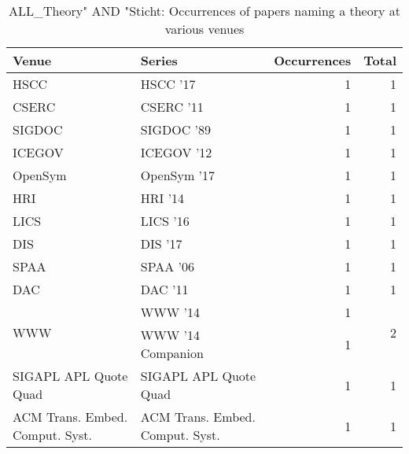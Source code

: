 \begin{table*}[t]
\begin{tabular}{llrr}
Venue & Series & Occurrences & Total\\\hline
\multirow{1}{*}{HSCC } & HSCC '17 & 1 & \multirow{1}{*}{1}\\
\multirow{1}{*}{CSERC } & CSERC '11 & 1 & \multirow{1}{*}{1}\\
\multirow{1}{*}{SIGDOC } & SIGDOC '89 & 1 & \multirow{1}{*}{1}\\
\multirow{1}{*}{ICEGOV } & ICEGOV '12 & 1 & \multirow{1}{*}{1}\\
\multirow{1}{*}{OpenSym } & OpenSym '17 & 1 & \multirow{1}{*}{1}\\
\multirow{1}{*}{HRI } & HRI '14 & 1 & \multirow{1}{*}{1}\\
\multirow{1}{*}{LICS } & LICS '16 & 1 & \multirow{1}{*}{1}\\
\multirow{1}{*}{DIS } & DIS '17 & 1 & \multirow{1}{*}{1}\\
\multirow{1}{*}{SPAA } & SPAA '06 & 1 & \multirow{1}{*}{1}\\
\multirow{1}{*}{DAC } & DAC '11 & 1 & \multirow{1}{*}{1}\\
\multirow{2}{*}{WWW } & WWW '14 & 1 & \multirow{2}{*}{2}\\
& WWW '14 Companion & 1 &\\
\multirow{1}{*}{SIGAPL APL Quote Quad} & SIGAPL APL Quote Quad & 1 & \multirow{1}{*}{1}\\
\multirow{1}{*}{ACM Trans. Embed. Comput. Syst.} & ACM Trans. Embed. Comput. Syst. & 1 & \multirow{1}{*}{1}\\
\end{tabular}
\caption{ALL\_Theory" AND "Sticht: Occurrences of papers naming a theory at various venues}
\end{table*}
